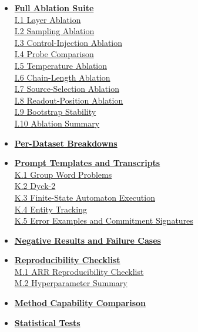 \documentclass[11pt]{article}
\begin{document}
{\begin{itemize}[itemsep=4pt,topsep=2pt,leftmargin=*]
  \hyperref[app:competitors-summary]{H.9 Comprehensive Comparison}
\item[\textbf{I}] \hyperref[app:ablations]{\textbf{Full Ablation Suite}}\\[1pt]
  \hyperref[app:ablation-layer]{I.1 Layer Ablation}\\
  \hyperref[app:ablation-sampling]{I.2 Sampling Ablation}\\
  \hyperref[app:ablation-control]{I.3 Control-Injection Ablation}\\
  \hyperref[app:ablation-probes]{I.4 Probe Comparison}\\
  \hyperref[app:ablation-temperature]{I.5 Temperature Ablation}\\
  \hyperref[app:ablation-chainlen]{I.6 Chain-Length Ablation}\\
  \hyperref[app:ablation-source]{I.7 Source-Selection Ablation}\\
  \hyperref[app:ablation-readout]{I.8 Readout-Position Ablation}\\
  \hyperref[app:ablation-bootstrap]{I.9 Bootstrap Stability}\\
  \hyperref[app:ablation-summary]{I.10 Ablation Summary}
\item[\textbf{J}] \hyperref[app:perdataset]{\textbf{Per-Dataset Breakdowns}}
\item[\textbf{K}] \hyperref[app:prompts]{\textbf{Prompt Templates and Transcripts}}\\[1pt]
  \hyperref[app:prompts-group]{K.1 Group Word Problems}\\
  \hyperref[app:prompts-dyck]{K.2 Dyck-2}\\
  \hyperref[app:prompts-fsa]{K.3 Finite-State Automaton Execution}\\
  \hyperref[app:prompts-entity]{K.4 Entity Tracking}\\
  \hyperref[app:prompts-errors]{K.5 Error Examples and Commitment Signatures}
\item[\textbf{L}] \hyperref[app:negative]{\textbf{Negative Results and Failure Cases}}
\item[\textbf{M}] \hyperref[app:checklist]{\textbf{Reproducibility Checklist}}\\[1pt]
  \hyperref[app:checklist-arr]{M.1 ARR Reproducibility Checklist}\\
  \hyperref[app:checklist-hyperparams]{M.2 Hyperparameter Summary}
\item[\textbf{N}] \hyperref[app:capability]{\textbf{Method Capability Comparison}}
\item[\textbf{O}] \hyperref[app:stattests]{\textbf{Statistical Tests}}\\[1pt]

\end{itemize}}
\end{document}
